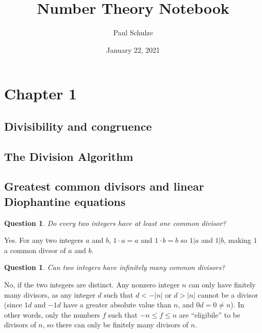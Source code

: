 \documentclass{article}
\title{Number Theory Notebook}
\author{Paul Schulze}
\date{January 22, 2021}
\newtheorem{ques}[thm]{Question}
\numberwithin{equation}{thm}
\begin{document}
\maketitle



\section{Chapter 1}


\subsection*{Divisibility and congruence}




\subsection*{The Division Algorithm}




\subsection*{Greatest common divisors and linear Diophantine equations}



\begin{ques}
  Do every two integers have at least one common divisor?
\end{ques}

Yes. For any two integers $a$ and $b$, $1 \cdot a = a$ and $1 \cdot b = b$ so $1 | a$ and $1 | b$, making $1$ a common divsor of $a$ and $b$.



\begin{ques}
  Can two integers have infinitely many common divisors?
\end{ques}

No, if the two integers are distinct. Any nonzero integer $n$ can only have finitely many divisors, as any integer $d$ such that $d < -|n|$ or $d > |n|$ cannot be a divisor (since $1d$ and $-1d$ have a greater absolute value than $n$, and $0d = 0 \neq n$). In other words, only the numbers $f$ such that $-n \leq f \leq n$ are ``eligibile'' to be divisors of $n$, so there can only be finitely many divisors of $n$.
\end{document}
